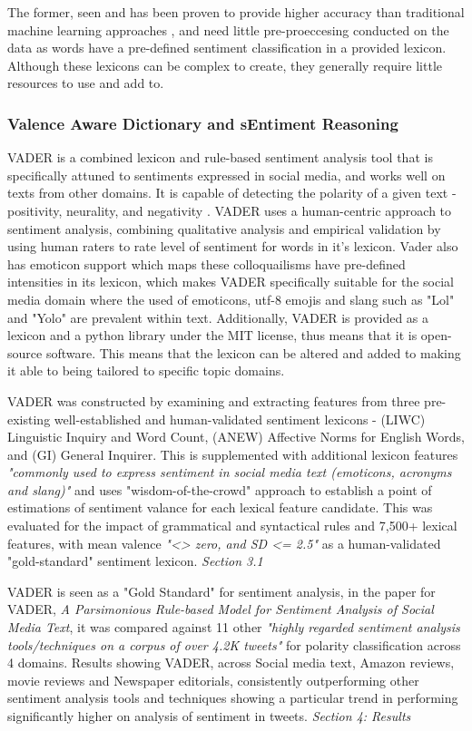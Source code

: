 \documentclass[oneside, 10pt]{article}
\begin{document}
			The former, seen and has been proven to provide higher accuracy than traditional machine learning approaches \cite{11}, and need little pre-proeccesing conducted on the data as words have a pre-defined sentiment classification in a provided lexicon. Although these lexicons can be complex to create, they generally require little resources to use and add to.
			
			\subsubsection{Valence Aware Dictionary and sEntiment Reasoning}\label{Vader}
				VADER is a combined lexicon and rule-based sentiment analysis tool that is specifically attuned to sentiments expressed in social media, and works well on texts from other domains. It is capable of detecting the polarity of a given text - positivity, neurality, and negativity \cite{12}. VADER uses a human-centric approach to sentiment analysis, combining qualitative analysis and empirical validation by using human raters to rate level of sentiment for words in it’s lexicon. Vader also has emoticon support which maps these colloquailisms have pre-defined intensities in its lexicon, which makes VADER specifically suitable for the social media domain where the used of emoticons, utf-8 emojis and slang such as "Lol" and "Yolo" are prevalent within text. Additionally, VADER is provided as a lexicon and a python library under the MIT license, thus means that it is open-source software. This means that the lexicon can be altered and added to making it able to being tailored to specific topic domains. 
				
				VADER was constructed by examining and extracting features from three pre-existing well-established and human-validated sentiment lexicons \cite{12} - (LIWC) Linguistic Inquiry and Word Count, (ANEW) Affective Norms for English Words, and (GI) General Inquirer. This is supplemented with additional lexicon features \textit{"commonly used to express sentiment in social media text (emoticons, acronyms and slang)"} \cite{12} and uses "wisdom-of-the-crowd" approach \cite{13} to establish a point of estimations of sentiment valance for each lexical feature candidate. This was evaluated for the impact of grammatical and syntactical rules and 7,500+ lexical features, with mean valence \textit{"<> zero, and SD <= 2.5"} as a human-validated "gold-standard" sentiment lexicon. \cite{12}\textit{Section 3.1}
				
				VADER is seen as a "Gold Standard" for sentiment analysis, in the paper for VADER, \cite{12} \textit{A Parsimonious Rule-based Model for Sentiment Analysis of Social Media Text}, it was compared against 11 other \textit{"highly regarded sentiment analysis tools/techniques on a corpus of over 4.2K tweets"} for polarity classification across 4 domains. Results showing VADER, across Social media text, Amazon reviews, movie reviews and Newspaper editorials, consistently outperforming other sentiment analysis tools and techniques showing a particular trend in performing significantly higher on analysis of sentiment in tweets. \cite{12} \textit{Section 4: Results}
			
\end{document}
